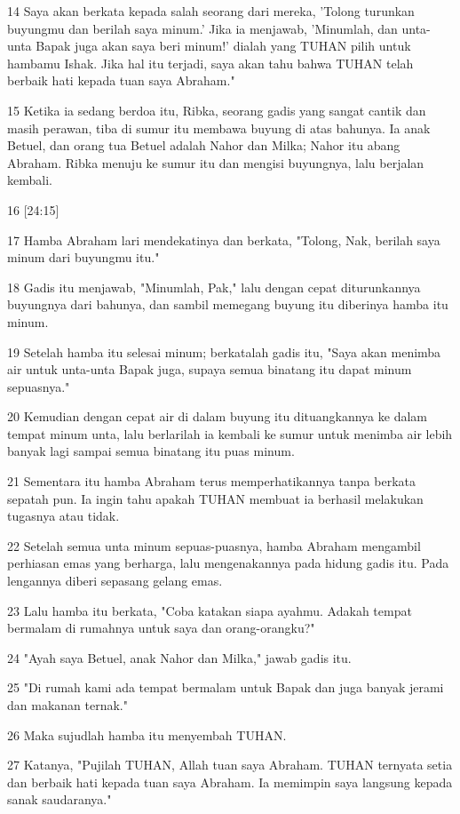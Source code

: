 \par 14 Saya akan berkata kepada salah seorang dari mereka, 'Tolong turunkan buyungmu dan berilah saya minum.' Jika ia menjawab, 'Minumlah, dan unta-unta Bapak juga akan saya beri minum!' dialah yang TUHAN pilih untuk hambamu Ishak. Jika hal itu terjadi, saya akan tahu bahwa TUHAN telah berbaik hati kepada tuan saya Abraham."
\par 15 Ketika ia sedang berdoa itu, Ribka, seorang gadis yang sangat cantik dan masih perawan, tiba di sumur itu membawa buyung di atas bahunya. Ia anak Betuel, dan orang tua Betuel adalah Nahor dan Milka; Nahor itu abang Abraham. Ribka menuju ke sumur itu dan mengisi buyungnya, lalu berjalan kembali.
\par 16 [24:15]
\par 17 Hamba Abraham lari mendekatinya dan berkata, "Tolong, Nak, berilah saya minum dari buyungmu itu."
\par 18 Gadis itu menjawab, "Minumlah, Pak," lalu dengan cepat diturunkannya buyungnya dari bahunya, dan sambil memegang buyung itu diberinya hamba itu minum.
\par 19 Setelah hamba itu selesai minum; berkatalah gadis itu, "Saya akan menimba air untuk unta-unta Bapak juga, supaya semua binatang itu dapat minum sepuasnya."
\par 20 Kemudian dengan cepat air di dalam buyung itu dituangkannya ke dalam tempat minum unta, lalu berlarilah ia kembali ke sumur untuk menimba air lebih banyak lagi sampai semua binatang itu puas minum.
\par 21 Sementara itu hamba Abraham terus memperhatikannya tanpa berkata sepatah pun. Ia ingin tahu apakah TUHAN membuat ia berhasil melakukan tugasnya atau tidak.
\par 22 Setelah semua unta minum sepuas-puasnya, hamba Abraham mengambil perhiasan emas yang berharga, lalu mengenakannya pada hidung gadis itu. Pada lengannya diberi sepasang gelang emas.
\par 23 Lalu hamba itu berkata, "Coba katakan siapa ayahmu. Adakah tempat bermalam di rumahnya untuk saya dan orang-orangku?"
\par 24 "Ayah saya Betuel, anak Nahor dan Milka," jawab gadis itu.
\par 25 "Di rumah kami ada tempat bermalam untuk Bapak dan juga banyak jerami dan makanan ternak."
\par 26 Maka sujudlah hamba itu menyembah TUHAN.
\par 27 Katanya, "Pujilah TUHAN, Allah tuan saya Abraham. TUHAN ternyata setia dan berbaik hati kepada tuan saya Abraham. Ia memimpin saya langsung kepada sanak saudaranya."
